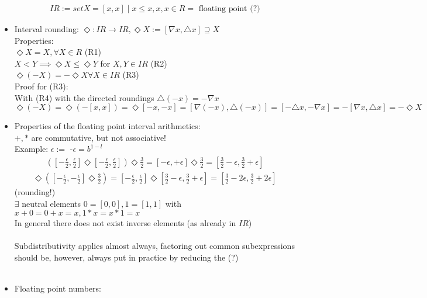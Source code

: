 \begin{itemize}
\begin{align*}
		IR:=set{X=[x,x]\mid x\le x, x,x\in R =\text{  floating point (?)}}
	\end{align*}
\item Interval rounding: $\Diamond : IR \to IR, \Diamond X:=[\nabla x, \triangle x] \supseteq X$ \\
Properties: \\
$\Diamond X=X, \forall X\in R$ (R1) \\
$X<Y \implies \Diamond X\le \Diamond Y$ for $X,Y\in IR$ (R2) \\
$\Diamond(-X)=-\Diamond X \forall X\in IR$ (R3) \\
Proof for (R3): \\
With (R4) with the directed roundings $\triangle(-x)=-\nabla x$ \\
$\Diamond(-X)=\Diamond (-[x,x])=\Diamond[-x,-x]=[\nabla(-x),\triangle(-x)]=[-\triangle x,-\nabla x]=-[\nabla x,\triangle x]=-\Diamond X$
\item Properties of the floating point interval arithmetics: \\
$+,\ast$ are commutative, but not associative! \\
Example: $\epsilon:=$ -$\epsilon=b^{1-l}$
\begin{align*}
	([-\frac{\epsilon}{2},\frac{\epsilon}{2}]\Diamond[-\frac{\epsilon}{2},\frac{\epsilon}{2}])\Diamond \frac{3}{2}=[-\epsilon,+\epsilon] \Diamond \frac{3}{2} =[\frac{3}{2}-\epsilon, \frac{3}{2}+\epsilon]
\end{align*}
\begin{align*}
	[-\frac{\epsilon}{2},\frac{\epsilon}{2}]\Diamond([-\frac{\epsilon}{2},-\frac{\epsilon}{2}]\Diamond \frac{3}{2})=[-\frac{\epsilon}{2},\frac{\epsilon}{2}]\Diamond [\frac{3}{2}-\epsilon , \frac{3}{2}+\epsilon]= [\frac{3}{2}-2\epsilon, \frac{3}{2}+2\epsilon]
\end{align*}
(rounding!)
\\
$\exists$ neutral elements $0=[0,0], 1=[1,1]$ with $x+0=0+x=x, 1*x=x*1=x$ \\
In general there does not exist inverse elements (as already in $IR$) \\
\\
Subdistributivity applies almost always, factoring out common subexpressions should be, however, always put in practice by reducing the (?) \\ 
\\
\item Floating point numbers:  \\

\end{itemize}
